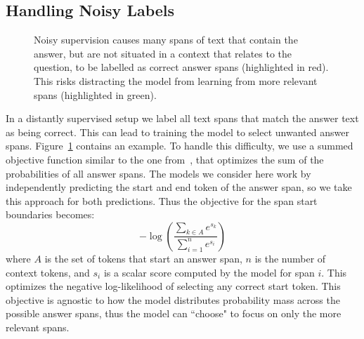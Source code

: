 \documentclass[11pt,a4paper]{article}
\begin{document}
\subsection{Handling Noisy Labels}
\label{sect:noisy-labels}
\begin{figure}[h]
\center
{}
\caption{Noisy supervision causes many spans of text that contain the answer, but are not situated in a context that relates to the question, to be labelled as correct answer spans (highlighted in red). This risks distracting the model from learning from more relevant spans (highlighted in green).}
\label{fig:noisy_labels}
\end{figure}

In a distantly supervised setup we label all text spans that match the answer text as being correct. This can lead to training the model to select unwanted answer spans. Figure~\ref{fig:noisy_labels} contains an example. 
To handle this difficulty, we use a summed objective function similar to the one from~\citet{kadlec2016text}, that optimizes the sum of the probabilities of all answer spans. The models we consider here work by independently predicting the start and end token of the answer span, so we take this approach for both predictions. Thus the objective for the span start boundaries becomes:
%
$$ -\log{\left(\frac{\sum_{k \in A} e^{s_k}}{\sum_{i=1}^n e^{s_i}}\right)} $$
%
where $A$ is the set of tokens that start an answer span, $n$ is the number of context tokens, and $s_i$ is a scalar score computed by the model for span $i$. This optimizes the negative log-likelihood of selecting any correct start token. 
This objective is agnostic to how the model distributes probability mass across the possible answer spans, thus the model can ``choose" to focus on only the more relevant spans. 
\end{document}
